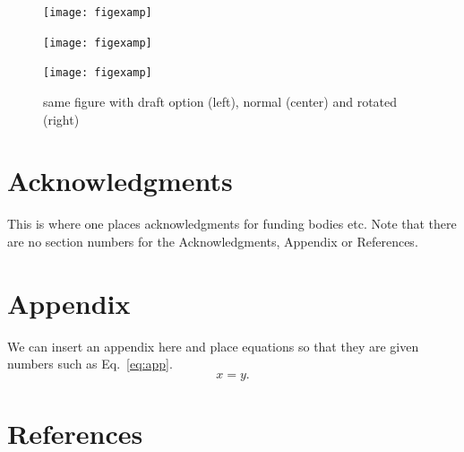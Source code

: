 \documentclass{moriond}
\def\be{\begin{equation}}
\def\ee{\end{equation}}
\begin{document}
\begin{figure}
\begin{minipage}{0.33\linewidth}
\centerline{\texttt{[image: figexamp]}}
\end{minipage}
\hfill
\begin{minipage}{0.32\linewidth}
\centerline{\texttt{[image: figexamp]}}
\end{minipage}
\hfill
\begin{minipage}{0.32\linewidth}
\centerline{\texttt{[image: figexamp]}}
\end{minipage}
\caption[]{same figure with draft option (left), normal (center) and rotated (right)}
\label{fig:radish}
\end{figure}

\section*{Acknowledgments}

This is where one places acknowledgments for funding bodies etc.
Note that there are no section numbers for the Acknowledgments, Appendix
or References.

\section*{Appendix}

 We can insert an appendix here and place equations so that they are
given numbers such as Eq.~\ref{eq:app}.
\be
x = y.
\label{eq:app}
\ee

\section*{References}


\end{document}
